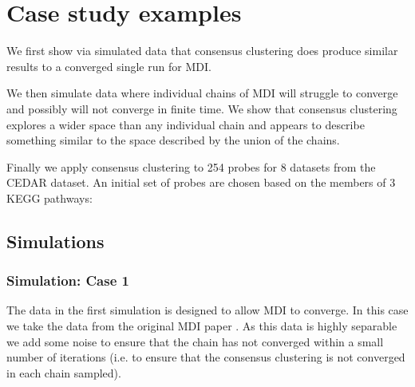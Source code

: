 \documentclass[12pt]{article} %
\begin{document}
	
	
	

	

	\section{Case study examples}
	We first show via simulated data that consensus clustering does produce similar results to a converged single run for MDI.
	
	We then simulate data where individual chains of MDI will struggle to converge and possibly will not converge in finite time. We show that consensus clustering explores a wider space than any individual chain and appears to describe something similar to the space described by the union of the chains.
	
	Finally we apply consensus clustering to 254 probes for 8 datasets from the CEDAR dataset. An initial set of probes are chosen based on the members of 3 KEGG pathways:
	
	\subsection{Simulations}
	\subsubsection{Simulation: Case 1} \label{sec:sim:data:case_1}
	The data in the first simulation is designed to allow MDI to converge. In this case we take the data from the original MDI paper \cite{KirkBayesiancorrelatedclustering2012}. As this data is highly separable we add some noise to ensure that the chain has not converged within a small number of iterations (i.e. to ensure that the consensus clustering is not converged in each chain sampled). 
	
\end{document}
